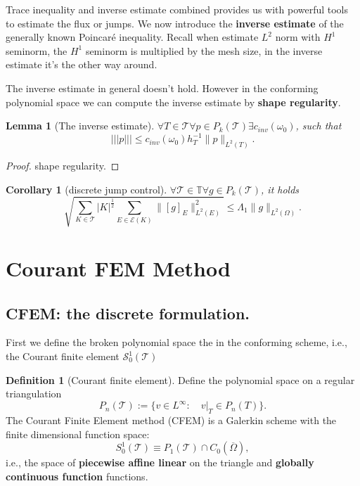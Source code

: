 \documentclass[a4paper,12pt,oneside,fleqn]{book}
\newtheorem{corollary}{Corollary}[theorem]
\newtheorem{lemma}[theorem]{Lemma}
\theoremstyle{definition}
\newtheorem{definition}{Definition}[section]
\theoremstyle{remark}
\begin{document}
Trace inequality and inverse estimate combined provides us with powerful tools to estimate the flux or jumps. We now introduce the \textbf{inverse estimate} of the generally known Poincar\'e inequality. Recall when estimate $L^2$ norm with $H^1$ seminorm, the $H^1$ seminorm is multiplied by the mesh size, in the inverse estimate it's the other way around. \par 
The inverse estimate in general doesn't hold. However in the conforming polynomial space we can compute the inverse estimate by \textbf{shape regularity}.

\begin{lemma}[The inverse estimate]
	$\forall T \in \mathcal{T}  \forall p \in P_k(\mathcal{T})  \exists c_{inv}(\omega_0)$, such that
	\begin{equation}
		|||p||| \le c_{inv}(\omega_0)h_T^{-1} \|p\|_{L^2(T)}. 
	\end{equation}
\end{lemma}
\begin{proof}
	shape regularity.
\end{proof}

\begin{corollary}[discrete jump control]
	$\forall \mathcal{T} \in \mathbb{T} \forall g \in P_k(\mathcal{T})$, it holds
\begin{equation}
	\sqrt{\sum_{K \in \mathcal{T}} |K|^\frac{1}{2} \sum_{E \in \mathcal{E}(K)} \|[g]_E\|_{L^2(E)}^2 } \le \Lambda_1 \|g\|_{L^2(\Omega)}. 
\end{equation}
\end{corollary}





\section{Courant FEM Method}
\subsection{CFEM: the discrete formulation.}
First we define the broken polynomial space the in the conforming scheme, i.e., the Courant finite element $\mathcal{S}^1_0(\mathcal{T})$
\begin{definition}[Courant finite element]
Define the polynomial space on a regular triangulation
\begin{equation}
	P_n(\mathcal{T}):= \{v \in L^\infty:\quad v|_T \in P_n(T)\}.
\end{equation}
	The Courant Finite Element method (CFEM) is a Galerkin scheme with the finite dimensional function space:
\begin{equation}
	S_0^1(\mathcal{T}) \equiv P_1(\mathcal{T}) \cap C_0(\overline{\Omega}), 
\end{equation}
i.e., the space of \textbf{piecewise affine linear} on the triangle  and \textbf{globally continuous function} functions. 
\end{definition}
\end{document}
